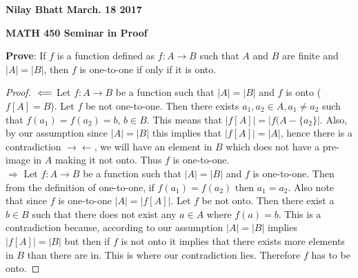 \documentclass[12pt, fullpage]{article}
\begin{document}
\begin{flushleft}
\textbf{Nilay Bhatt March. 18 2017}		
\end{flushleft}
\begin{center}		
{\bf MATH 450 Seminar in Proof}
 \\
\end{center}
\textbf{Prove}: If $f$ is a function defined as $f: A \rightarrow B$ such that $A$ and $B$ are finite and $\vert A \vert = \vert B \vert$, then $f$ is one-to-one if only if it is onto.

\begin{proof}
$\\ \Longleftarrow$ Let $f: A \rightarrow B$ be a function such that $\vert A \vert = \vert B \vert$ and $f$ is onto ($f[A] = B$). Let $f$ be not one-to-one. Then there exists $a_1,a_2 \in A, a_1 \neq a_2$ such that $f(a_1) = f(a_2) = b$, $b \in B$. This means that $|f[A]| = |f(A-\{a_2\}|$. Also, by our assumption since $\vert A \vert = \vert B \vert$ this implies that $|f[A]| = |A|$, hence there is a contradiction $\rightarrow\leftarrow$, we will have an element in $B$ which does not have a pre-image in $A$ making it not onto. Thus $f$ is one-to-one.\\


$\Longrightarrow$  Let $f: A \rightarrow B$ be a function such that $\vert A \vert = \vert B \vert$ and $f$ is one-to-one. Then from the definition of one-to-one, if $f(a_1) = f(a_2)$ then $a_1 = a_2$. Also note that since $f$ is one-to-one $|A| =\left|f[A]\right|$. Let $f$ be not onto. Then there exist a $b \in B$ such that there does not exist any $a \in A$ where $f(a) = b$. This is a contradiction because, according to our assumption $ |A| = |B|$ implies $|f[A]| = |B|$ but then if $f$ is not onto it implies that there exists more elements in $B$ than there are in.  This is where our contradiction lies. Therefore $f$ has to be onto.
\end{proof}
\end{document}

